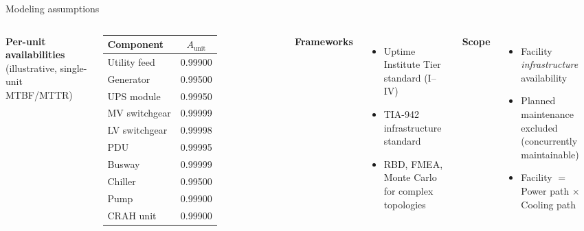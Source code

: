 \begin{frame}{Modeling assumptions}
  \begin{columns}[T]
      \textbf{Per-unit availabilities} (illustrative, single-unit MTBF/MTTR)
      \vspace{0.3em}
      \footnotesize
      \renewcommand{\arraystretch}{1.15}
      \begin{tabular}{lc}
        \toprule
        Component & $A_{\text{unit}}$ \\
        \midrule
        Utility feed      & 0.99900 \\
        Generator         & 0.99500 \\
        UPS module        & 0.99950 \\
        MV switchgear     & 0.99999 \\
        LV switchgear     & 0.99998 \\
        PDU               & 0.99995 \\
        Busway            & 0.99999 \\
        Chiller           & 0.99500 \\
        Pump              & 0.99900 \\
        CRAH unit         & 0.99900 \\
        \bottomrule
      \end{tabular}
      \textbf{Frameworks}
      \begin{itemize}
        \item Uptime Institute Tier standard (I--IV)
        \item TIA-942 infrastructure standard
        \item RBD, FMEA, Monte Carlo for complex topologies
      \end{itemize}
      \vspace{0.6em}
      \textbf{Scope}
      \begin{itemize}
        \item Facility \emph{infrastructure} availability
        \item Planned maintenance excluded (concurrently maintainable)
        \item Facility $=$ Power path $\times$ Cooling path
      \end{itemize}
  \end{columns}
\end{frame}


